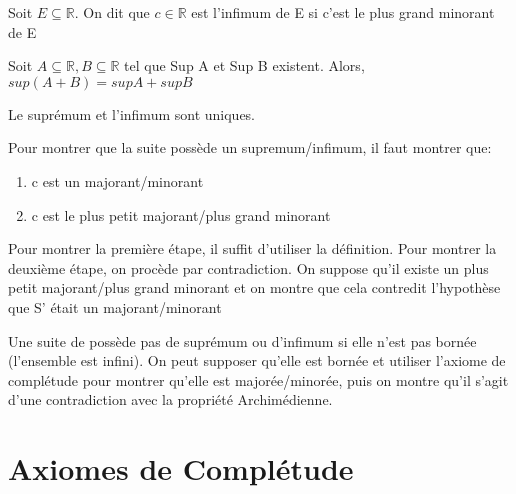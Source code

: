 \documentclass{article}
\begin{document}
\begin{definition}[Infimum]
    Soit $E \subseteq \mathbb{R}$. On dit que $c \in \mathbb{R}$ est l'infimum
    de E si c'est le plus grand minorant de E
\end{definition}

\begin{proposition}
    Soit $ A \subseteq \mathbb{R}, B \subseteq \mathbb{R}$ tel que Sup A et Sup B
    existent. Alors, $sup(A+B)= sup A + sup B$
\end{proposition}

\begin{proposition}
    Le suprémum et l'infimum sont uniques.
\end{proposition}

\begin{problem}
    Pour montrer que la suite possède un supremum/infimum, il faut montrer que:
    \begin{enumerate}
	\item c est un majorant/minorant
	\item c est le plus petit majorant/plus grand minorant
    \end{enumerate}

    Pour montrer la première étape, il suffit d'utiliser la définition. Pour
    montrer la deuxième étape, on procède par contradiction. On suppose qu'il
    existe un plus petit majorant/plus grand minorant et on montre que cela
    contredit l'hypothèse que S' était un majorant/minorant

\end{problem}

\begin{problem}
    Une suite de possède pas de suprémum ou d'infimum si elle n'est pas bornée
    (l'ensemble est infini). On peut supposer qu'elle est bornée et utiliser
    l'axiome de complétude pour montrer qu'elle est majorée/minorée, puis on
    montre qu'il s'agit d'une contradiction avec la propriété Archimédienne.
\end{problem}

\begin{problem}
\end{problem}

\pagebreak
\section{Axiomes de Complétude}
\end{document}
